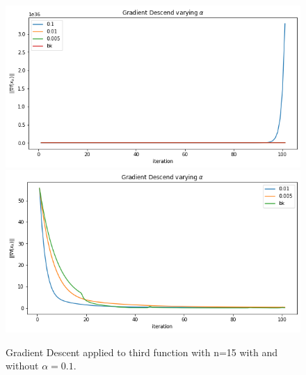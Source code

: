 \documentclass[a4paper,10pt]{report}
\begin{document}
\begin{figure}[!htb]
    \includegraphics[width=\linewidth]{3_a_n15_1.png}
  \endminipage\hfill
    \includegraphics[width=\linewidth]{3_a_n15_2.png}
  \endminipage\hfill
  \caption{Gradient Descent applied to third function with n=15 with and without $\alpha=0.1$.}
  \label{fig:3_n15}
\end{figure}
\end{document}

